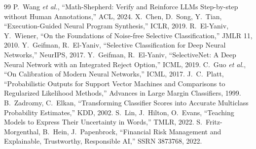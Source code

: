 \documentclass[10pt]{article}
\begin{document}
\begin{thebibliography}{99}
 P.~Wang \emph{et al.}, ``Math-Shepherd: Verify and Reinforce LLMs Step-by-step without Human Annotations,'' ACL, 2024.
 X.~Chen, D.~Song, Y.~Tian, ``Execution-Guided Neural Program Synthesis,'' ICLR, 2019.
 R.~El-Yaniv, Y.~Wiener, ``On the Foundations of Noise-free Selective Classification,'' JMLR 11, 2010.
 Y.~Geifman, R.~El-Yaniv, ``Selective Classification for Deep Neural Networks,'' NeurIPS, 2017.
 Y.~Geifman, R.~El-Yaniv, ``SelectiveNet: A Deep Neural Network with an Integrated Reject Option,'' ICML, 2019.
 C.~Guo \emph{et al.}, ``On Calibration of Modern Neural Networks,'' ICML, 2017.
 J.~C.~Platt, ``Probabilistic Outputs for Support Vector Machines and Comparisons to Regularized Likelihood Methods,'' Advances in Large Margin Classifiers, 1999.
 B.~Zadrozny, C.~Elkan, ``Transforming Classifier Scores into Accurate Multiclass Probability Estimates,'' KDD, 2002.
 S.~Lin, J.~Hilton, O.~Evans, ``Teaching Models to Express Their Uncertainty in Words,'' TMLR, 2022.
 S.~Fritz-Morgenthal, B.~Hein, J.~Papenbrock, ``Financial Risk Management and Explainable, Trustworthy, Responsible AI,'' SSRN 3873768, 2022.
\end{thebibliography}
\end{document}
